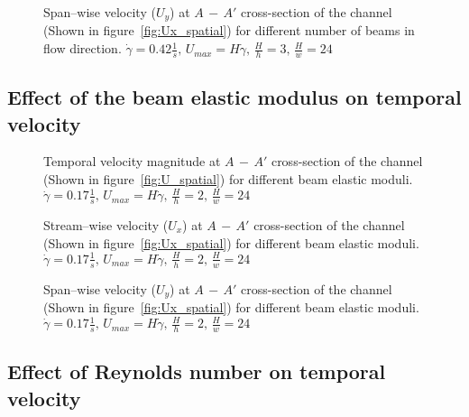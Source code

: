 \documentclass[preprint, letterpaper, nobibnotes, aps, superscriptaddress,prb]{revtex4-1}
\begin{document}
\begin{figure}[H]
  \centering {}
  \caption{Span--wise velocity ($U_y$) at $A\,-\,A'$ cross-section of the channel (Shown in figure~\ref{fig:Ux_spatial}) for different number of beams in flow direction. $\dot{\gamma}=0.42 \frac{1}{s},\,U_{max}=H\dot{\gamma},\,\frac{H}{h}=3,\,\frac{H}{w}=24$}\protect\label{fig:Nb_Uy}
\end{figure}

\subsection{Effect of the beam elastic modulus on temporal velocity}


\begin{figure}[H]
  \centering {}
  \caption{Temporal velocity magnitude at $A\,-\,A'$ cross-section of the channel (Shown in figure~\ref{fig:U_spatial}) for different beam elastic moduli. $\dot{\gamma}=0.17 \frac{1}{s},\,U_{max}=H\dot{\gamma},\,\frac{H}{h}=2,\,\frac{H}{w}=24$ }\protect\label{fig:EE_U}
\end{figure}

\begin{figure}[H]
  \centering {}
  \caption{Stream--wise velocity ($U_x$) at $A\,-\,A'$ cross-section of the channel (Shown in figure~\ref{fig:Ux_spatial}) for different beam elastic moduli. $\dot{\gamma}=0.17 \frac{1}{s},\,U_{max}=H\dot{\gamma},\,\frac{H}{h}=2,\,\frac{H}{w}=24$}\protect\label{fig:EE_Ux}
\end{figure}

\begin{figure}[H]
  \centering {}
  \caption{Span--wise velocity ($U_y$) at $A\,-\,A'$ cross-section of the channel (Shown in figure~\ref{fig:Ux_spatial}) for different beam elastic moduli. $\dot{\gamma}=0.17 \frac{1}{s},\,U_{max}=H\dot{\gamma},\,\frac{H}{h}=2,\,\frac{H}{w}=24$ }\protect\label{fig:EE_Uy}
\end{figure}

\subsection{Effect of Reynolds number on temporal velocity}
\end{document}

